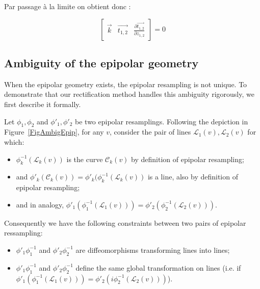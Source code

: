 \documentclass{ipol}
\newcommand{\LineE}[1]{\ensuremath{\mathcal{L}_{#1}}}
\newcommand{\LineO}{\LineE{1}}
\newcommand{\LineT}{\LineE{2}}
\newcommand{\LineK}{\LineE{k}}
\newcommand{\CurveE}[1]{\ensuremath{\mathcal{C}_{#1}}}
\newcommand{\CurveO}{\CurveE{1}}
\newcommand{\CurveT}{\CurveE{2}}
\newcommand{\CurveK}{\CurveE{k}}
\newcommand{\BigV}[1]{\ensuremath{\overrightarrow{#1}}}
\newcommand{\TanOT}[1]{\BigV{t_{1,2}#1}}
\newcommand{\DerPart}[2]{\frac{\partial #1}{\partial #2}}
\begin{document}
Par passage \`a la limite on obtient donc :

\begin{equation}
\left[ \begin{array}{c|c|c}
	\BigV{k} & \TanOT{}  & \DerPart { \TanOT{}}{z_{1,2}}  
\end{array} \right]  
=0
\label{EpiplabEq}
\end{equation}







\subsection{Ambiguity of the epipolar geometry}

When the epipolar geometry exists, the epipolar resampling is not unique. To demonstrate that our rectification method handles this ambiguity rigorously, we first describe it formally.


Let $\phi_1,\phi_2$ and  $\phi'_1,\phi'_2$ be two epipolar resamplings. Following the depiction in Figure~\ref{FigAmbigEpip}, for any $v$, consider the pair of lines $\LineO(v),\LineT(v)$ for which:

\begin{itemize}
   \item  $\phi_k^{-1}(\LineK(v))$ is the curve $\CurveK(v)$ by definition of epipolar resampling;
   \item  and $\phi'_k (\CurveK(v)) = \phi'_k ( \phi_k^{-1}(\LineK(v))$ is a line, also by definition of epipolar resampling;
   \item and in analogy, $\phi'_1 ( \phi_1^{-1}(\LineO(v))) = \phi'_2 ( \phi_2^{-1}(\LineT(v)))$.
\end{itemize}

Consequently we have the following constraints between two pairs of epipolar ressampling:

\begin{itemize}
   \item  $\phi'_1 \phi_1^{-1}$  and $\phi'_2 \phi_2^{-1}$ are diffeomorphisms transforming lines into lines;
   \item $\phi'_1 \phi_1^{-1}$  and $\phi'_2 \phi_2^{-1}$ define the same global transformation on lines
        (i.e. if $\phi'_1 (\phi_1^{-1} (\LineO(v))) = \phi'_2 (i\phi_2^{-1}(\LineT(v)))$).
\end{itemize}


\end{document}
